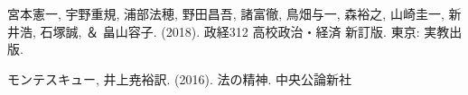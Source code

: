 \documentclass[main.tex]{subfiles}
\begin{document}
\newpage
{}
\begin{thebibliography}{99}

\item 宮本憲一, 宇野重規, 浦部法穂, 野田昌吾, 諸富徹, 鳥畑与一, 森裕之, 山崎圭一, 新井浩, 石塚誠, ＆ 畠山容子. (2018). 政経312 高校政治・経済 新訂版. 東京: 実教出版.

\item モンテスキュー, 井上尭裕訳. (2016). 法の精神. 中央公論新社
\end{thebibliography}
\end{document}
